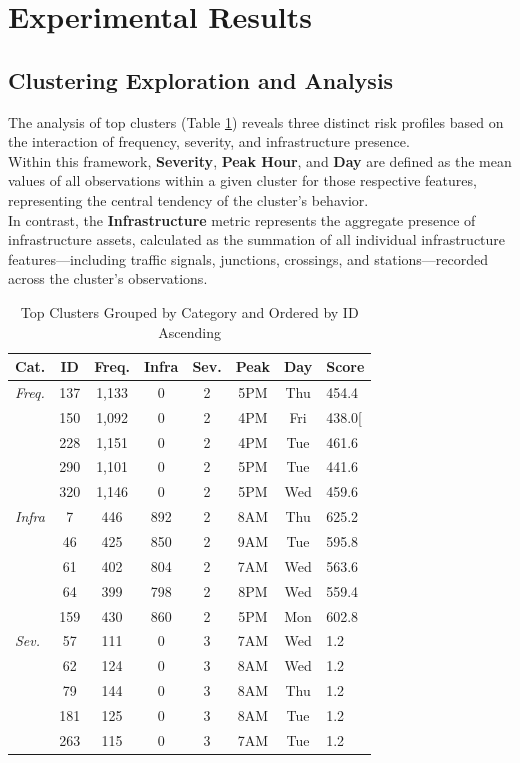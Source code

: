 \documentclass[conference]{IEEEtran}
\begin{document}
\section{\textbf{Experimental Results}}

\subsection{\textbf{Clustering Exploration and Analysis}}

The analysis of top clusters (Table \ref{cluster_analysis_refined}) reveals three distinct risk profiles based on the interaction of frequency, severity, and infrastructure presence.\\
\indent Within this framework, \textbf{Severity}, \textbf{Peak Hour}, and \textbf{Day} are defined as the mean values of all observations within a given cluster for those respective features, representing the central tendency of the cluster's behavior.\\
\indent In contrast, the \textbf{Infrastructure} metric represents the aggregate presence of infrastructure assets, calculated as the summation of all individual infrastructure features—including traffic signals, junctions, crossings, and stations—recorded across the cluster's observations.

\begin{table}[htbp]
	\centering
	\footnotesize
	\setlength{\tabcolsep}{3pt} 
	\begin{tabular}{@{}lccccccl@{}}
		\toprule
		\textbf{Cat.} & \textbf{ID} & \textbf{Freq.} & \textbf{Infra} & \textbf{Sev.} & \textbf{Peak} & \textbf{Day} & \textbf{Score} \\ \midrule
		\textit{Freq.} 
		& 137 & 1,133 & 0   & 2 & 5PM & Thu & 454.4 \\
		& 150 & 1,092 & 0   & 2 & 4PM & Fri & 438.0[ \\
		& 228 & 1,151 & 0   & 2 & 4PM & Tue & 461.6 \\
		& 290 & 1,101 & 0   & 2 & 5PM & Tue & 441.6 \\
		& 320 & 1,146 & 0   & 2 & 5PM & Wed & 459.6 \\ \midrule
		\textit{Infra} 
		& 7   & 446   & 892 & 2 & 8AM & Thu & 625.2 \\
		& 46  & 425   & 850 & 2 & 9AM & Tue & 595.8 \\
		& 61  & 402   & 804 & 2 & 7AM & Wed & 563.6 \\
		& 64  & 399   & 798 & 2 & 8PM & Wed & 559.4 \\
		& 159 & 430   & 860 & 2 & 5PM & Mon & 602.8 \\ \midrule
		\textit{Sev.} 
		& 57  & 111   & 0   & 3 & 7AM & Wed & 1.2 \\
		& 62  & 124   & 0   & 3 & 8AM & Wed & 1.2 \\
		& 79  & 144   & 0   & 3 & 8AM & Thu & 1.2 \\
		& 181 & 125   & 0   & 3 & 8AM & Tue & 1.2 \\
		& 263 & 115   & 0   & 3 & 7AM & Tue & 1.2 \\ \bottomrule
	\end{tabular}
	\caption{Top Clusters Grouped by Category and Ordered by ID Ascending}
	\label{cluster_analysis_refined}
\end{table}
\end{document}
